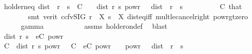 \begin{isabellebody}
\ holder{\isacharunderscore}{\kern0pt}neq{\isacharunderscore}{\kern0pt}{}{\isacharcolon}{\kern0pt}\ {\isachardoublequoteopen}dist\ {\isacharparenleft}{\kern0pt}{\isasymphi}\ r{\isacharparenright}{\kern0pt}\ {\isacharparenleft}{\kern0pt}{\isasymphi}\ s{\isacharparenright}{\kern0pt}\ {\isacharless}{\kern0pt}\ {\isacharparenleft}{\kern0pt}C\ {\isacharplus}{\kern0pt}\ {}{\isacharparenright}{\kern0pt}\ {\isacharasterisk}{\kern0pt}\ dist\ r\ s\ powr\ {\isasymgamma}{\isachardoublequoteclose}\ \ {\isachardoublequoteopen}dist\ {\isacharparenleft}{\kern0pt}{\isasymphi}\ r{\isacharparenright}{\kern0pt}\ {\isacharparenleft}{\kern0pt}{\isasymphi}\ s{\isacharparenright}{\kern0pt}\ {\isachargreater}{\kern0pt}\ {}{\isachardoublequoteclose}\isanewline
\ \ \ \ \ \ \isamarkupfalse%
\ C{\isacharparenleft}{\kern0pt}{}{\isacharparenright}{\kern0pt}\ that\isanewline
\ \ \ \ \ \ \isamarkupfalse%
\ {\isacharparenleft}{\kern0pt}smt\ {\isacharparenleft}{\kern0pt}verit{\isacharcomma}{\kern0pt}\ ccfv{\isacharunderscore}{\kern0pt}SIG{\isacharparenright}{\kern0pt}\ {\isacartoucheopen}r\ {\isasymin}\ X{\isacartoucheclose}\ {\isacartoucheopen}s\ {\isasymin}\ X{\isacartoucheclose}\ dist{\isacharunderscore}{\kern0pt}eq{\isacharunderscore}{\kern0pt}{}{\isacharunderscore}{\kern0pt}iff\ mult{\isacharunderscore}{\kern0pt}le{\isacharunderscore}{\kern0pt}cancel{\isacharunderscore}{\kern0pt}right\ powr{\isacharunderscore}{\kern0pt}gt{\isacharunderscore}{\kern0pt}zero{\isacharparenright}{\kern0pt}\isanewline
\ \ \ \ \isamarkupfalse%
\ gamma{\isacharcolon}{\kern0pt}\ {\isachardoublequoteopen}{\isasymgamma}\ {\isasymin}\ {\isacharbraceleft}{\kern0pt}{}{\isacharless}{\kern0pt}{\isachardot}{\kern0pt}{\isachardot}{\kern0pt}{}{\isacharbraceright}{\kern0pt}{\isachardoublequoteclose}\isanewline
\ \ \ \ \ \ \isamarkupfalse%
\ assms\ holder{\isacharunderscore}{\kern0pt}on{\isacharunderscore}{\kern0pt}def\ \isamarkupfalse%
\ blast{\isacharplus}{\kern0pt}\isanewline
\ \ \ \ \isamarkupfalse%
\ {\isachardoublequoteopen}dist\ r\ s\ {\isacharless}{\kern0pt}\ {\isacharparenleft}{\kern0pt}e{\isacharslash}{\kern0pt}C{\isacharparenright}{\kern0pt}\ powr\ {\isacharparenleft}{\kern0pt}{}\ {\isacharslash}{\kern0pt}\ {\isasymgamma}{\isacharparenright}{\kern0pt}{\isachardoublequoteclose}\isanewline
\ \ \ \ \isamarkupfalse%
\ \isamarkupfalse%
\ {\isachardoublequoteopen}C\ {\isacharasterisk}{\kern0pt}\ dist\ r\ s\ powr\ {\isasymgamma}\ {\isacharless}{\kern0pt}\ C\ {\isacharasterisk}{\kern0pt}\ {\isacharparenleft}{\kern0pt}{\isacharparenleft}{\kern0pt}e{\isacharslash}{\kern0pt}C{\isacharparenright}{\kern0pt}\ powr\ {\isacharparenleft}{\kern0pt}{}\ {\isacharslash}{\kern0pt}\ {\isasymgamma}{\isacharparenright}{\kern0pt}{\isacharparenright}{\kern0pt}\ powr\ {\isasymgamma}{\isachardoublequoteclose}\ \ {\isachardoublequoteopen}dist\ {\isacharparenleft}{\kern0pt}{\isasymphi}\ r{\isacharparenright}{\kern0pt}\ {\isacharparenleft}{\kern0pt}{\isasymphi}\ s{\isacharparenright}{\kern0pt}\ {\isachargreater}{\kern0pt}\ {}{\isachardoublequoteclose}\isanewline

\end{isabellebody}
